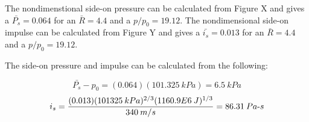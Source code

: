\documentclass[10pt,parskip=half,
toc=sectionentrywithdots,
bibliography=totocnumbered,
captions=tableheading,numbers=noendperiod]{scrartcl}
\begin{document}
The nondimenstional side-on pressure can be calculated from Figure X and
gives a \(\bar{P_s} = 0.064\) for an \(\bar{R}=4.4\) and a
\(p/p_0 = 19.12\). The nondimensional side-on impulse can be calculated
from Figure Y and gives a \(\bar{i_s} = 0.013\) for an \(\bar{R}=4.4\)
and a \(p/p_0 = 19.12\).

The side-on pressure and impulse can be calculated from the following:

\begin{equation}\bar{P_s} - p_0 = (0.064)(101.325\:kPa) = 6.5\:kPa\end{equation}
\begin{equation}i_s = \frac{(0.013)(101325\:kPa)^{2/3}(1160.9E6\:J)^{1/3}}{340\:m/s}= 86.31\:Pa {\text -} s\end{equation}



\end{document}
